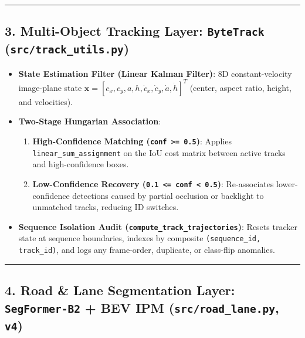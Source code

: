 \documentclass[10.5pt,a4paper]{article}
\begin{document}
\par\noindent\rule{\textwidth}{0.4pt}\par\medskip

\subsection{3. Multi-Object Tracking Layer: \texttt{ByteTrack} (\texttt{src/\allowbreak{}track\_\allowbreak{}utils.\allowbreak{}py})}

\begin{itemize}[leftmargin=1.5em,itemsep=2pt]
\item \textbf{State Estimation Filter (Linear Kalman Filter)}: 8D constant-velocity image-plane state $\mathbf{x} = [c_x, c_y, a, h, \dot{c}_x, \dot{c}_y, \dot{a}, \dot{h}]^T$ (center, aspect ratio, height, and velocities).
\item \textbf{Two-Stage Hungarian Association}:
\begin{enumerate}[leftmargin=1.8em,itemsep=2pt]
\item \textbf{High-Confidence Matching (\texttt{conf >= 0.\allowbreak{}5})}: Applies \texttt{linear\_\allowbreak{}sum\_\allowbreak{}assignment} on the IoU cost matrix between active tracks and high-confidence boxes.
\item \textbf{Low-Confidence Recovery (\texttt{0.\allowbreak{}1 <= conf < 0.\allowbreak{}5})}: Re-associates lower-confidence detections caused by partial occlusion or backlight to unmatched tracks, reducing ID switches.
\end{enumerate}
\item \textbf{Sequence Isolation Audit (\texttt{compute\_\allowbreak{}track\_\allowbreak{}trajectories})}: Resets tracker state at sequence boundaries, indexes by composite \texttt{(sequence\_\allowbreak{}id,\allowbreak{} track\_\allowbreak{}id)}, and logs any frame-order, duplicate, or class-flip anomalies.
\end{itemize}

\par\noindent\rule{\textwidth}{0.4pt}\par\medskip

\subsection{4. Road \& Lane Segmentation Layer: \texttt{SegFormer-\allowbreak{}B2} + BEV IPM (\texttt{src/\allowbreak{}road\_\allowbreak{}lane.\allowbreak{}py}, \texttt{v4})}
\end{document}
